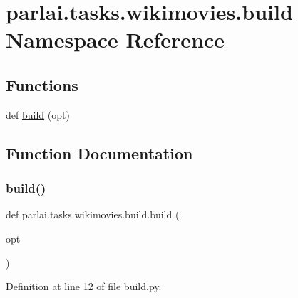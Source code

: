 \hypertarget{namespaceparlai_1_1tasks_1_1wikimovies_1_1build}{}\section{parlai.\+tasks.\+wikimovies.\+build Namespace Reference}
\label{namespaceparlai_1_1tasks_1_1wikimovies_1_1build}
\subsection*{Functions}
\begin{DoxyCompactItemize}
\item 
def \hyperlink{namespaceparlai_1_1tasks_1_1wikimovies_1_1build_ab6770dc56d9b37e12ea2766d235a46e7}{build} (opt)
\end{DoxyCompactItemize}


\subsection{Function Documentation}
\mbox{\label{namespaceparlai_1_1tasks_1_1wikimovies_1_1build_ab6770dc56d9b37e12ea2766d235a46e7}} 
\subsubsection{\texorpdfstring{build()}{build()}}
{\footnotesize\ttfamily def parlai.\+tasks.\+wikimovies.\+build.\+build (\begin{DoxyParamCaption}\item[{}]{opt }\end{DoxyParamCaption})}



Definition at line 12 of file build.\+py.


